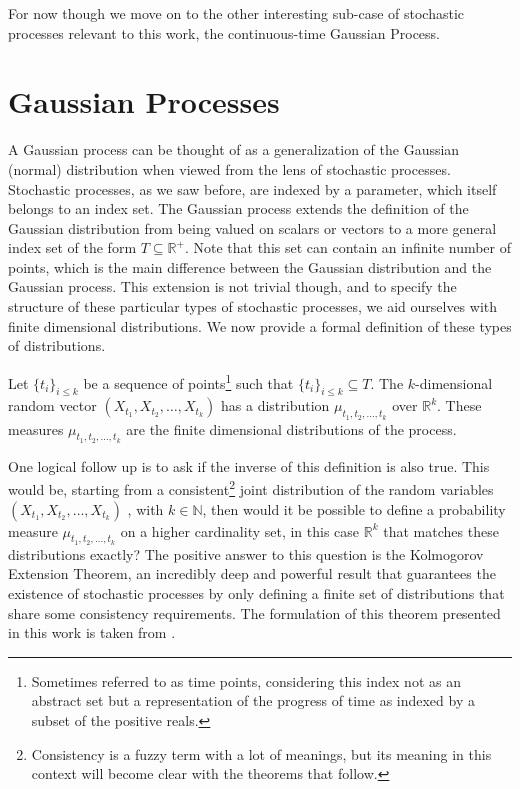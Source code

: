 For now though we move on to the other interesting sub-case of stochastic processes relevant to this work, the continuous-time Gaussian Process. 

\section{Gaussian Processes}

A Gaussian process can be thought of as a generalization of the Gaussian (normal) distribution when viewed from the lens of stochastic processes. Stochastic processes, as we saw before, are indexed by a parameter, which itself belongs to an index set. The Gaussian process extends the definition of the Gaussian distribution from being valued on scalars or vectors to a more general index set of the form $T \subseteq \mathbb{R}^+$. Note that this set can contain an infinite number of points, which is the main difference between the Gaussian distribution and the Gaussian process. This extension is not trivial though, and to specify the structure of these particular types of stochastic processes, we aid ourselves with finite dimensional distributions. We now provide a formal definition of these types of distributions. 

\begin{definition}
	Let $\{ t_i \}_{i \leq k}$ be a sequence of points\footnote{Sometimes referred to as time points, considering this index not as an abstract set but a representation of the progress of time as indexed by a subset of the positive reals.} such that $\{ t_i \}_{i \leq k} \subseteq T$. The $k$-dimensional random vector $(X_{t_1}, X_{t_2}, \ldots, X_{t_k})$ has a distribution $\mu_{t_1, t_2, \ldots, t_k}$ over $\mathbb{R}^k$. These measures $\mu_{t_1, t_2, \ldots, t_k}$ are the finite dimensional distributions of the process. 
\end{definition}

One logical follow up is to ask if the inverse of this definition is also true. This would be, starting from a consistent\footnote{Consistency is a fuzzy term with a lot of meanings, but its meaning in this context will become clear with the theorems that follow.} joint distribution of the random variables $(X_{t_1}, X_{t_2}, \ldots, X_{t_k})$ , with $k \in \mathbb{N}$, then would it be possible to define a probability measure $\mu_{t_1, t_2, \ldots, t_k}$ on a higher cardinality set, in this case $\mathbb{R}^k$ that matches these distributions exactly? The positive answer to this question is the Kolmogorov Extension Theorem, an incredibly deep and powerful result that guarantees the existence of stochastic processes by only defining a finite set of distributions that share some consistency requirements. The formulation of this theorem presented in this work is taken from \cite[Theorem 2.1.5]{oksendal2003stochastic}.

